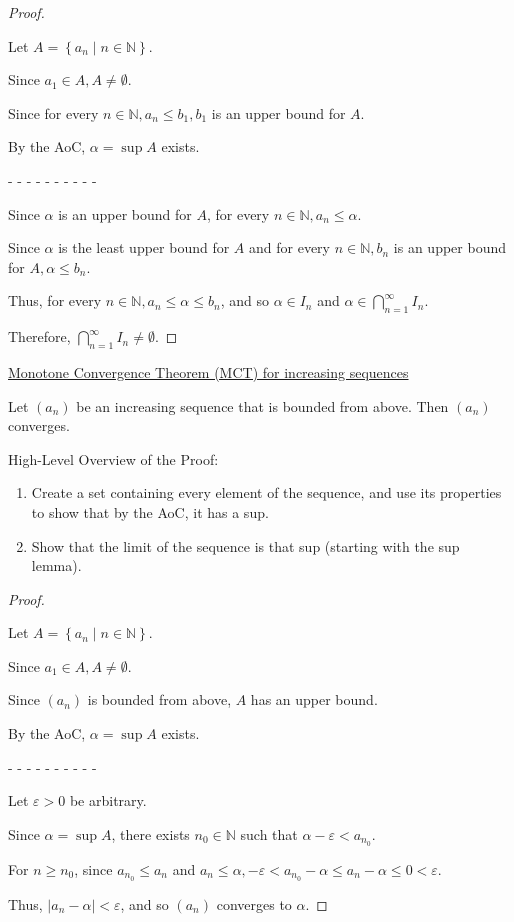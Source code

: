 \documentclass[12pt]{article}
\newcommand{\NN}{\mathbb{N}}
\newcommand\set[1]{\left\lbrace #1 \right\rbrace} %
\newcommand\abs[1]{\left| #1 \right|} %
\newcommand{\eps}{\varepsilon}
\begin{document}
\dotfill

\begin{proof}
$ $

Let $A = \set{a_n \mid n \in \NN}$.

Since $a_1 \in A, A \ne \emptyset$.

Since for every $n \in \NN, a_n \le b_1, b_1$ is an upper bound for $A$.

By the AoC, $\alpha = \sup A$ exists.

- - - - - - - - - -

Since $\alpha$ is an upper bound for $A$, for every $n \in \NN, a_n \le \alpha$.

Since $\alpha$ is the least upper bound for $A$ and for every $n \in \NN, b_n$ is an upper bound for $A, \alpha \le b_n$.

Thus, for every $n \in \NN, a_n \le \alpha \le b_n$, and so $\alpha \in I_n$ and $\alpha \in \bigcap_{n = 1}^{\infty} I_n$.

Therefore, $\bigcap_{n = 1}^{\infty} I_n \ne \emptyset$.
\end{proof}

\pagebreak

\underline{Monotone Convergence Theorem (MCT) for increasing sequences}

Let $(a_n)$ be an increasing sequence that is bounded from above. Then $(a_n)$ converges.

\dotfill

High-Level Overview of the Proof:

\begin{enumerate}
\item Create a set containing every element of the sequence, and use its properties to show that by the AoC, it has a sup.

\item Show that the limit of the sequence is that sup (starting with the sup lemma).
\end{enumerate}

\dotfill

\begin{proof}
$ $

Let $A = \set{a_n \mid n \in \NN}$.

Since $a_1 \in A, A \ne \emptyset$.

Since $(a_n)$ is bounded from above, $A$ has an upper bound.

By the AoC, $\alpha = \sup A$ exists.

- - - - - - - - - -

Let $\eps > 0$ be arbitrary.

Since $\alpha = \sup A$, there exists $n_0 \in \NN$ such that $\alpha - \eps < a_{n_0}$.

For $n \ge n_0$, since $a_{n_0} \le a_n$ and $a_n \le \alpha, -\eps < a_{n_0} - \alpha \le a_n - \alpha \le 0 < \eps$.

Thus, $\abs{a_n - \alpha} < \eps$, and so $(a_n)$ converges to $\alpha$.
\end{proof}
\end{document}
